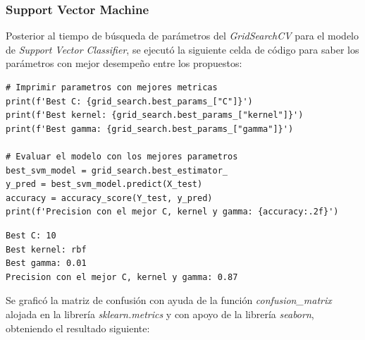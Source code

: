 \subsubsection{Support Vector Machine}

Posterior al tiempo de búsqueda de parámetros del \textit{GridSearchCV} para el modelo de \textit{Support Vector Classifier}, se ejecutó la siguiente celda de código para saber los parámetros con mejor desempeño entre los propuestos: \\


\begin{lstlisting}[caption={Código para impresión de parámetros con mejor desempeño y evaluación del modelo}]
# Imprimir parametros con mejores metricas
print(f'Best C: {grid_search.best_params_["C"]}')
print(f'Best kernel: {grid_search.best_params_["kernel"]}')
print(f'Best gamma: {grid_search.best_params_["gamma"]}')

# Evaluar el modelo con los mejores parametros
best_svm_model = grid_search.best_estimator_
y_pred = best_svm_model.predict(X_test)
accuracy = accuracy_score(Y_test, y_pred)
print(f'Precision con el mejor C, kernel y gamma: {accuracy:.2f}')
\end{lstlisting}


\begin{lstlisting}[caption={Impresión mejores parámetros y evaluación del modelo}]
Best C: 10
Best kernel: rbf
Best gamma: 0.01
Precision con el mejor C, kernel y gamma: 0.87
\end{lstlisting}

Se graficó la matriz de confusión con ayuda de la función \textit{confusion\_matrix} alojada en la librería \textit{sklearn.metrics} y con apoyo de la librería \textit{seaborn}, obteniendo el resultado siguiente:

